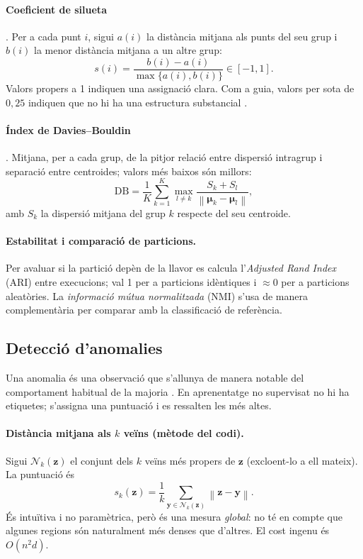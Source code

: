 \documentclass[11pt,a4paper]{article}
\newcommand{\norm}[1]{\left\lVert #1 \right\rVert}
\begin{document}
\paragraph{Coeficient de silueta} \cite{rousseeuw1987}. Per a cada punt $i$, sigui
$a(i)$ la distància mitjana als punts del seu grup i $b(i)$ la menor distància
mitjana a un altre grup:
\begin{equation}
  s(i)=\frac{b(i)-a(i)}{\max\{a(i),b(i)\}}\in[-1,1].
\end{equation}
Valors propers a 1 indiquen una assignació clara. Com a guia, valors per sota
de $0{,}25$ indiquen que no hi ha una estructura substancial
\cite{kaufman1990}.

\paragraph{Índex de Davies--Bouldin} \cite{davies1979}. Mitjana, per a cada
grup, de la pitjor relació entre dispersió intragrup i separació entre
centroides; valors més baixos són millors:
\begin{equation}
  \mathrm{DB}=\frac1K\sum_{k=1}^K\max_{l\neq k}\frac{S_k+S_l}{\norm{\boldsymbol\mu_k-\boldsymbol\mu_l}},
\end{equation}
amb $S_k$ la dispersió mitjana del grup $k$ respecte del seu centroide.

\paragraph{Estabilitat i comparació de particions.} Per avaluar si la partició
depèn de la llavor es calcula l'\emph{Adjusted Rand Index} (ARI)
\cite{hubert1985} entre execucions; val 1 per a particions idèntiques i
$\approx 0$ per a particions aleatòries. La \emph{informació mútua
normalitzada} (NMI) s'usa de manera complementària per comparar amb la
classificació de referència.

\subsection{Detecció d'anomalies}
Una anomalia és una observació que s'allunya de manera notable del
comportament habitual de la majoria \cite{chandola2009}. En aprenentatge no
supervisat no hi ha etiquetes; s'assigna una puntuació i es ressalten les més
altes.

\paragraph{Distància mitjana als $k$ veïns (mètode del codi).} Sigui
$\mathcal{N}_k(\mathbf{z})$ el conjunt dels $k$ veïns més propers de
$\mathbf{z}$ (excloent-lo a ell mateix). La puntuació és
\cite{ramaswamy2000}
\begin{equation}
  s_k(\mathbf{z})=\frac1k\sum_{\mathbf{y}\in\mathcal{N}_k(\mathbf{z})}\norm{\mathbf{z}-\mathbf{y}} .
\end{equation}
És intuïtiva i no paramètrica, però és una mesura \emph{global}: no té en
compte que algunes regions són naturalment més denses que d'altres. El cost
ingenu és $O(n^2d)$.
\end{document}
